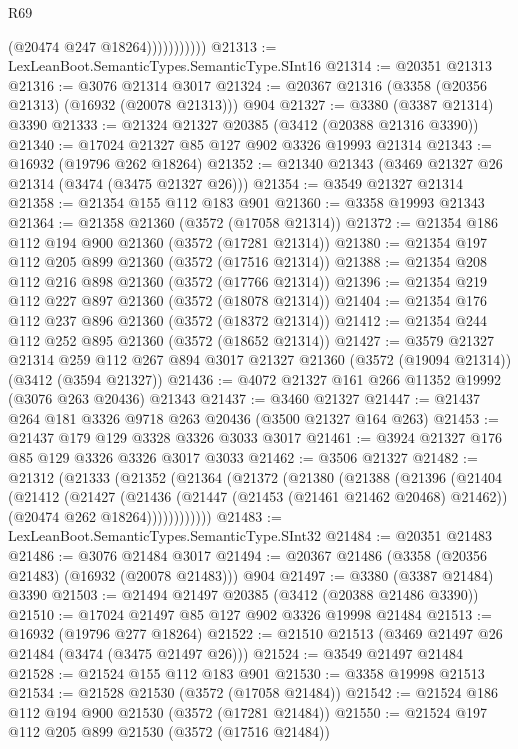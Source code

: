 \begin{lexlean}{R69}
\begin{coremodule}
                        (@20474 @247 @18264)))))))))))
@21313 := LexLeanBoot.SemanticTypes.SemanticType.SInt16
@21314 := @20351 @21313
@21316 := @3076 @21314 @3017
@21324 := @20367 @21316 (@3358 (@20356 @21313) (@16932 (@20078 @21313))) @904
@21327 := @3380 (@3387 @21314) @3390
@21333 := @21324 @21327 @20385 (@3412 (@20388 @21316 @3390))
@21340 := @17024 @21327 @85 @127 @902 @3326 @19993 @21314
@21343 := @16932 (@19796 @262 @18264)
@21352 := @21340 @21343 (@3469 @21327 @26 @21314 (@3474 (@3475 @21327 @26)))
@21354 := @3549 @21327 @21314
@21358 := @21354 @155 @112 @183 @901
@21360 := @3358 @19993 @21343
@21364 := @21358 @21360 (@3572 (@17058 @21314))
@21372 := @21354 @186 @112 @194 @900 @21360 (@3572 (@17281 @21314))
@21380 := @21354 @197 @112 @205 @899 @21360 (@3572 (@17516 @21314))
@21388 := @21354 @208 @112 @216 @898 @21360 (@3572 (@17766 @21314))
@21396 := @21354 @219 @112 @227 @897 @21360 (@3572 (@18078 @21314))
@21404 := @21354 @176 @112 @237 @896 @21360 (@3572 (@18372 @21314))
@21412 := @21354 @244 @112 @252 @895 @21360 (@3572 (@18652 @21314))
@21427 := @3579
    @21327
    @21314
    @259
    @112
    @267
    @894
    @3017
    @21327
    @21360
    (@3572 (@19094 @21314))
    (@3412 (@3594 @21327))
@21436 := @4072 @21327 @161 @266 @11352 @19992 (@3076 @263 @20436) @21343
@21437 := @3460 @21327
@21447 := @21437 @264 @181 @3326 @9718 @263 @20436 (@3500 @21327 @164 @263)
@21453 := @21437 @179 @129 @3328 @3326 @3033 @3017
@21461 := @3924 @21327 @176 @85 @129 @3326 @3326 @3017 @3033
@21462 := @3506 @21327
@21482 := @21312
    (@21333
      (@21352
        (@21364
          (@21372
            (@21380
              (@21388
                (@21396
                  (@21404
                    (@21412
                      (@21427
                        (@21436
                          (@21447 (@21453 (@21461 @21462 @20468) @21462))
                          (@20474 @262 @18264))))))))))))
@21483 := LexLeanBoot.SemanticTypes.SemanticType.SInt32
@21484 := @20351 @21483
@21486 := @3076 @21484 @3017
@21494 := @20367 @21486 (@3358 (@20356 @21483) (@16932 (@20078 @21483))) @904
@21497 := @3380 (@3387 @21484) @3390
@21503 := @21494 @21497 @20385 (@3412 (@20388 @21486 @3390))
@21510 := @17024 @21497 @85 @127 @902 @3326 @19998 @21484
@21513 := @16932 (@19796 @277 @18264)
@21522 := @21510 @21513 (@3469 @21497 @26 @21484 (@3474 (@3475 @21497 @26)))
@21524 := @3549 @21497 @21484
@21528 := @21524 @155 @112 @183 @901
@21530 := @3358 @19998 @21513
@21534 := @21528 @21530 (@3572 (@17058 @21484))
@21542 := @21524 @186 @112 @194 @900 @21530 (@3572 (@17281 @21484))
@21550 := @21524 @197 @112 @205 @899 @21530 (@3572 (@17516 @21484))

\end{coremodule}
\end{lexlean}
